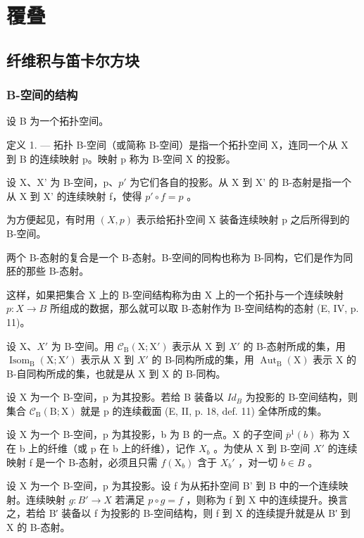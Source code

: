 
\chapter{覆叠}

\section{纤维积与笛卡尔方块}

\subsection{B-空间的结构}

设 B 为一个拓扑空间。

定义 1. --- 拓扑 B-空间（或简称 B-空间）是指一个拓扑空间 X，连同一个从 X 到 B 的连续映射 p。映射 p 称为 B-空间 X 的投影。

设 X、X' 为 B-空间，p、\(p'\) 为它们各自的投影。从 X 到 X' 的 B-态射是指一个从 X 到 X' 的连续映射 f，使得 \(p' \circ f = p\) 。

为方便起见，有时用 \((X,p)\) 表示给拓扑空间 X 装备连续映射 p 之后所得到的 B-空间。

两个 B-态射的复合是一个 B-态射。B-空间的同构也称为 B-同构，它们是作为同胚的那些 B-态射。

这样，如果把集合 X 上的 B-空间结构称为由 X 上的一个拓扑与一个连续映射 \(p: X \rightarrow B\) 所组成的数据，那么就可以取 B-态射作为 B-空间结构的态射 (E, IV, p. 11)。

设 X、\(X'\) 为 B-空间。用 \(\mathcal{C}_{\mathrm{B}}(\mathrm{X};\mathrm{X}')\) 表示从 X 到 \(X'\) 的 B-态射所成的集，用 \(\operatorname{Isom}_{\mathrm{B}}(\mathrm{X};\mathrm{X}')\) 表示从 X 到 \(X'\) 的 B-同构所成的集，用 \(\operatorname{Aut}_{\mathrm{B}}(\mathrm{X})\) 表示 X 的 B-自同构所成的集，也就是从 X 到 X 的 B-同构。

设 X 为一个 B-空间，p 为其投影。若给 B 装备以 \(Id_{B}\) 为投影的 B-空间结构，则集合 \(\mathcal{C}_{\mathrm{B}}(\mathrm{B};\mathrm{X})\) 就是 p 的连续截面 (E, II, p. 18, def. 11) 全体所成的集。

设 X 为一个 B-空间，p 为其投影，b 为 B 的一点。X 的子空间 \(\overline{p}^{1}(b)\) 称为 X 在 b 上的纤维（或 p 在 b 上的纤维），记作 \(X_{b}\) 。为使从 X 到 B-空间 \(X'\) 的连续映射 f 是一个 B-态射，必须且只需 \(f(\mathrm{X}_{b})\) 含于 \(X_{b}'\) ，对一切 \(b \in B\) 。

设 X 为一个 B-空间，p 为其投影。设 f 为从拓扑空间 B' 到 B 中的一个连续映射。连续映射 \(g: B' \to X\) 若满足 \(p \circ g = f\) ，则称为 f 到 X 中的连续提升。换言之，若给 B′ 装备以 f 为投影的 B-空间结构，则 f 到 X 的连续提升就是从 B′ 到 X 的 B-态射。

